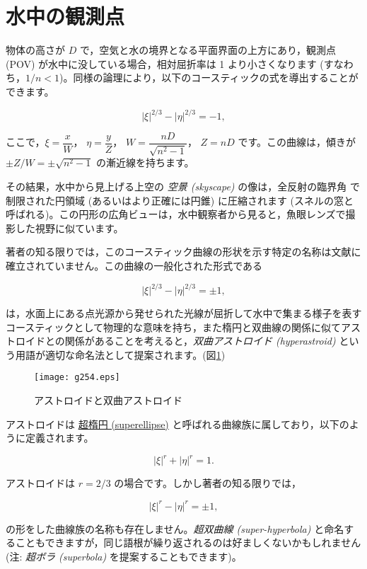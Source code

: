 \documentclass[twocolumn]{article}
\begin{document}
\section{水中の観測点}

物体の高さが $D$ で，空気と水の境界となる平面界面の上方にあり，観測点 (POV) が水中に没している場合，相対屈折率は 1 より小さくなります (すなわち，$1/n < 1$)。同様の論理により，以下のコースティックの式を導出することができます。

$$ \left| \xi \right|^{2/3} - \left| \eta \right|^{2/3} = -1, $$

ここで，$\xi = \dfrac{x}{W}，$ $\eta = \dfrac{y}{Z}，$ $W = \dfrac{nD}{\sqrt{n^2-1}}，$ $Z = nD$ です。この曲線は，傾きが $\pm Z/W = \pm \sqrt{n^2-1}$ の漸近線を持ちます。

その結果，水中から見上げる上空の \emph{空景 (skyscape)} の像は，全反射の臨界角  で制限された円領域 (あるいはより正確には円錐) に圧縮されます (スネルの窓と呼ばれる)。この円形の広角ビューは，水中観察者から見ると，魚眼レンズで撮影した視野に似ています。

著者の知る限りでは，このコースティック曲線の形状を示す特定の名称は文献に確立されていません。この曲線の一般化された形式である

$$ \left| \xi \right|^{2/3} - \left| \eta \right|^{2/3} = \pm1, $$

は，水面上にある点光源から発せられた光線が屈折して水中で集まる様子を表すコースティックとして物理的な意味を持ち，また楕円と双曲線の関係に似てアストロイドとの関係があることを考えると，\emph{双曲アストロイド (hyperastroid)} という用語が適切な命名法として提案されます。(図\ref{fig:hyperastroid})

\begin{figure}
	\centering
	\texttt{[image: g254.eps]}
	\caption{アストロイドと双曲アストロイド}
	\label{fig:hyperastroid}
\end{figure}

アストロイドは \href{https://mathworld.wolfram.com/Astroid.html}{超楕円 (superellipse)} と呼ばれる曲線族に属しており，以下のように定義されます。

$$ \left| \xi \right|^{r} + \left| \eta \right|^{r} = 1. $$

アストロイドは $r = 2/3$ の場合です。しかし著者の知る限りでは，

$$ \left| \xi \right|^{r} - \left| \eta \right|^{r} = \pm 1, $$

の形をした曲線族の名称も存在しません。\emph{超双曲線 (super-hyperbola)} と命名することもできますが，同じ語根が繰り返されるのは好ましくないかもしれません (注: \emph{超ボラ (superbola)} を提案することもできます)。
\end{document}
